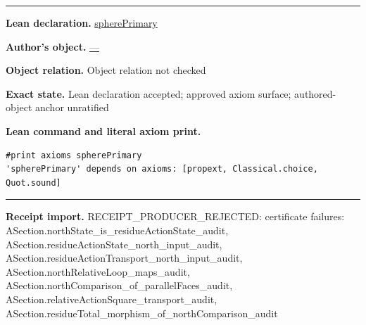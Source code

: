 \documentclass[11pt]{article}
\theoremstyle{plain}
\theoremstyle{definition}
\theoremstyle{remark}
\begin{document}
\begin{tcolorbox}[provenancecard,title={44. Definition - \$A\$-sections},title after break={44. Definition - \$A\$-sections (continued)}]
\medskip\hrule\medskip
\textbf{Lean declaration.} \url{spherePrimary}
\par\textbf{Author's object.} \url{—}
\par\textbf{Object relation.} Object relation not checked
\par\textbf{Exact state.} Lean declaration accepted; approved axiom surface; authored-object anchor unratified
\par\smallskip\textbf{Lean command and literal axiom print.}
\begin{Verbatim}[breaklines=true,breakanywhere=true,fontsize=\small]
#print axioms spherePrimary
'spherePrimary' depends on axioms: [propext, Classical.choice, Quot.sound]
\end{Verbatim}
\medskip\hrule\medskip
\textbf{Receipt import.} \textcolor{KgtRed}{RECEIPT\_PRODUCER\_REJECTED: certificate failures: ASection.northState\_is\_residueActionState\_audit, ASection.residueActionState\_north\_input\_audit, ASection.residueActionTransport\_north\_input\_audit, ASection.northRelativeLoop\_maps\_audit, ASection.northComparison\_of\_parallelFaces\_audit, ASection.relativeActionSquare\_transport\_audit, ASection.residueTotal\_morphism\_of\_northComparison\_audit}
\end{tcolorbox}
\medskip
\end{document}
